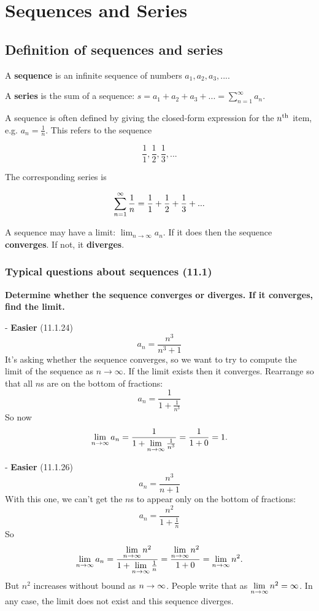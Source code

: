 \section{Sequences and Series}

\subsection{Definition of sequences and series}

A \textbf{sequence} is an infinite sequence of numbers $a_1, a_2, a_3, ...$.

A \textbf{series} is the sum of a sequence: $s = a_1 + a_2 + a_3 + ... = \sum_{n=1}^\infty a_n$.

A sequence is often defined by giving the closed-form expression for the $n^{\text{th}}$ item, e.g. $a_n = \frac{1}{n}$. This refers to the sequence

$$\frac{1}{1}, \frac{1}{2}, \frac{1}{3}, ...$$

The corresponding series is

$$
\sum_{n=1}^{\infty} \frac{1}{n} = \frac{1}{1} + \frac{1}{2} + \frac{1}{3} + ...
$$

A sequence may have a limit: $\lim_{n \rightarrow \infty} a_n$. If it does then the sequence \textbf{converges}. If not, it \textbf{diverges}.

\subsubsection{Typical questions about sequences (11.1)}


\textbf{Determine whether the sequence converges or diverges. If it converges, find the limit.}

- \textbf{Easier} (11.1.24)
  $$
  a_n = \frac{n^3}{n^3 + 1}
  $$
  It's asking whether the sequence converges, so we want to try to compute the limit of the sequence as $n \rightarrow \infty$. If the limit exists then it converges. Rearrange so that all $n$s are on the bottom of fractions:
  $$
  a_n = \frac{1}{1 + \frac{1}{n^3}}
  $$
  So now
  $$
  \lim\limits_{n \to \infty} a_n = \frac{1}{1 + \lim\limits_{n \to \infty}\frac{1}{n^3}} = \frac{1}{1 + 0} = 1.
  $$

- \textbf{Easier} (11.1.26)
  $$
  a_n = \frac{n^3}{n + 1}
  $$
  With this one, we can't get the $n$s to appear only on the bottom of fractions:
  $$
  a_n = \frac{n^2}{1 + \frac{1}{n}}
  $$
  So
  $$
  \lim\limits_{n \to \infty} a_n = \frac{\lim\limits_{n \to \infty} n^2}{1 + \lim\limits_{n \to \infty}\frac{1}{n}} = \frac{\lim\limits_{n \to \infty} n^2}{1 + 0} = \lim\limits_{n \to \infty} n^2.
  $$
  But $n^2$ increases without bound as $n \rightarrow \infty$. People write that as $\lim\limits_{n \to \infty} n^2 = \infty$. In any case, the limit does not exist and this sequence diverges.

